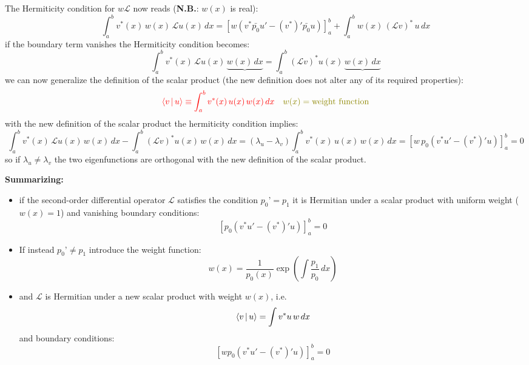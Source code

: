 \documentclass{article}
\begin{document}
\noindent
The Hermiticity condition for $w\mathcal{L}$ now reads (\textbf{N.B.}: $w(x)$ is real):
\begin{equation}
    \int_a^b v^*(x)\, w(x)\, \mathcal{L} u(x)\, dx
=
\left[
w \left(v^* \bar{p_0} u' - (v^*)' \bar{p_0} u \right)
\right]_a^b
+
\int_a^b w(x)\, (\mathcal{L} v)^*\, u\, dx
\end{equation}
if the boundary term vanishes the Hermiticity condition becomes:
\begin{equation}
    \int_a^b v^*(x)\, \mathcal{L} u(x)\, \underbrace{w(x)\, dx}
=
\int_a^b \left( \mathcal{L} v \right)^* u(x)\, \underbrace{w(x)\, dx}
\end{equation}
we can now generalize the definition of the scalar product (the new definition does not alter any of its required properties):
\begin{equation}
    \color{red} \Braket{v | u} \equiv \int_a^b v^*(x)\, u(x)\, w(x)\, dx \quad 
    \color{olive} w(x) = \text{weight function} \color{black}
\end{equation}
with the new definition of the scalar product the hermiticity condition implies:
\begin{equation}
    \int_a^b v^*(x)\, \mathcal{L} u(x)\, w(x)\, dx 
- \int_a^b \left(\mathcal{L} v\right)^* u(x)\, w(x)\, dx 
= (\lambda_u - \lambda_v) \int_a^b v^*(x)\, u(x)\, w(x)\, dx 
= \left[ w\, p_0 \left(v^* u' - (v^*)' u\right) \right]_a^b = 0
\end{equation}
so if $\lambda_u \neq \lambda_v$ the two eigenfunctions are orthogonal with the new definition of the scalar product.
\newpage

\noindent
\textbf{Summarizing:}
\begin{itemize}
    \item if the second-order differential operator $\mathcal{L}$ satisfies the condition $p_0’=p_1$ it is Hermitian under a scalar product with uniform weight ($w(x)=1$) and vanishing boundary conditions:
    \begin{equation}
        \left[ p_0 \left( v^* u' - (v^*)' u \right) \right]_a^b = 0
    \end{equation}
    \item If instead $p_0’\neq p_1$ introduce the weight function:
    \begin{equation}
        w(x) = \frac{1}{p_0(x)} \exp\left( \int \frac{p_1}{p_0} \, dx \right)
    \end{equation}
    \item and $\mathcal{L}$ is Hermitian under a new scalar product with weight $w(x)$, i.e.
    \begin{equation}
        \Braket{v|u} = \int v^* u\, w\, dx
    \end{equation}
    and boundary conditions:
    \begin{equation}
        \left[ w p_0 \left( v^* u' - (v^*)' u \right) \right]_a^b = 0
    \end{equation}
\end{itemize}
\end{document}
